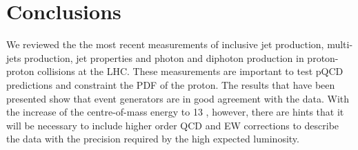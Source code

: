 \documentclass{PoS}
\begin{document}
\section{Conclusions}

We reviewed the the most recent measurements of inclusive jet production, multi-jets production, jet properties and
photon and diphoton production in proton-proton collisions at the LHC. These measurements are important to test pQCD
predictions and constraint the PDF of the proton. The results that have been presented show that
event generators are in good agreement with the data. With the increase of the
centre-of-mass energy to 13 \TeV, however, there are hints that it will be necessary to include higher order QCD and EW
corrections to describe the data with the precision required by the high expected luminosity. 
\end{document}
